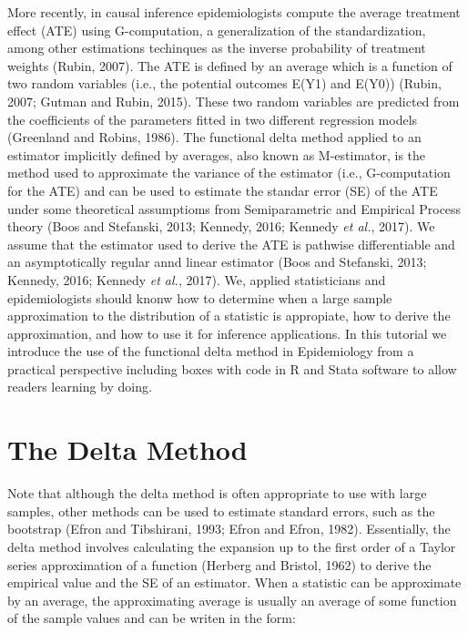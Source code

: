 \documentclass[
]{article}
\begin{document}
More recently, in causal inference epidemiologists compute the average
treatment effect (ATE) using G-computation, a generalization of the
standardization, among other estimations techinques as the inverse
probability of treatment weights (Rubin, 2007). The ATE is defined by an
average which is a function of two random variables (i.e., the potential
outcomes E(Y1) and E(Y0)) (Rubin, 2007; Gutman and Rubin, 2015). These
two random variables are predicted from the coefficients of the
parameters fitted in two different regression models (Greenland and
Robins, 1986). The functional delta method applied to an estimator
implicitly defined by averages, also known as M-estimator, is the method
used to approximate the variance of the estimator (i.e., G-computation
for the ATE) and can be used to estimate the standar error (SE) of the
ATE under some theoretical assumptioms from Semiparametric and Empirical
Process theory (Boos and Stefanski, 2013; Kennedy, 2016; Kennedy
\emph{et al.}, 2017). We assume that the estimator used to derive the
ATE is pathwise differentiable and an asymptotically regular annd linear
estimator (Boos and Stefanski, 2013; Kennedy, 2016; Kennedy \emph{et
al.}, 2017). We, applied statisticians and epidemiologists should knonw
how to determine when a large sample approximation to the distribution
of a statistic is appropiate, how to derive the approximation, and how
to use it for inference applications. In this tutorial we introduce the
use of the functional delta method in Epidemiology from a practical
perspective including boxes with code in R and Stata software to allow
readers learning by doing.

\hypertarget{the-delta-method}{%
\section{The Delta Method}\label{the-delta-method}}

Note that although the delta method is often appropriate to use with
large samples, other methods can be used to estimate standard errors,
such as the bootstrap (Efron and Tibshirani, 1993; Efron and Efron,
1982). Essentially, the delta method involves calculating the expansion
up to the first order of a Taylor series approximation of a function
(Herberg and Bristol, 1962) to derive the empirical value and the SE of
an estimator. When a statistic can be approximate by an average, the
approximating average is usually an average of some function of the
sample values and can be writen in the form:
\end{document}
